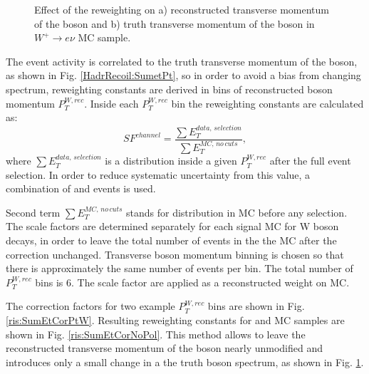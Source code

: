 \begin{figure}[!p]
\begin{minipage}[h]{0.49\linewidth}
\end{minipage}
\hfill
\begin{minipage}[h]{0.49\linewidth}
\end{minipage}
\caption{Effect of the \sumet reweighting on a) reconstructed transverse momentum of the boson and b) truth transverse momentum of the boson in $W^{+} \to e\nu$ MC sample.}
\label{HadrRecoil:PtSpectrum}
\end{figure}

The event activity \sumet is correlated to the truth transverse momentum of the boson, as shown in Fig. \ref{HadrRecoil:SumetPt}, so in order to avoid a bias from changing \ptw spectrum, reweighting constants are derived in bins of reconstructed boson momentum $P_T^{W, rec}$. Inside each $P_T^{W, rec}$ bin the reweighting constants are calculated as:
\begin{equation}
SF^{channel}=\frac{\sum E_T^{data, \, selection} }{\sum E_T^{MC,\, no\, cuts} },
\end{equation}
where $\sum E_T^{data,\, selection} $ is a \sumet distribution inside a given $P_T^{W, rec}$ after the full event selection. In order to reduce systematic uncertainty from this value, a combination of \wenu and \wmunu events is used. 

Second term $\sum E_T^{MC,\, no\, cuts}$ stands for \sumet distribution in MC before any selection. The scale factors are determined separately for each signal MC for W boson decays, in order to leave the total number of events in the the MC after the correction unchanged. Transverse boson momentum binning is chosen so that there is approximately the same number of events per bin. The total number of $P_T^{W, rec}$ bins is 6. The scale factor are applied as a reconstructed weight on MC.

The correction factors for two example $P_T^{W, rec}$ bins are shown in Fig.\ref{ris:SumEtCorPtW}. Resulting reweighting constants for \wenu and \wmunu MC samples are shown in Fig. \ref{ris:SumEtCorNoPol}. This method allows to leave the reconstructed transverse momentum of the boson nearly unmodified and introduces only a small change in a the truth boson spectrum, as shown in Fig. \ref{HadrRecoil:PtSpectrum}. 

